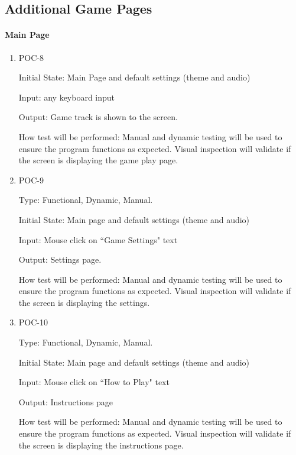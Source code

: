 \documentclass[12pt, titlepage]{article}
\begin{document}
\subsection{Additional Game Pages}

\paragraph{Main Page}

\begin{enumerate}

\item{POC-8\\}
					
Initial State: Main Page and default settings (theme and audio)
					
Input: any keyboard input 
					
Output: Game track is shown to the screen. 
					
How test will be performed: Manual and dynamic testing will be used to ensure the program functions as expected. Visual inspection will validate if the screen is displaying the game play page. 
					
\item{POC-9\\}

Type: Functional, Dynamic, Manual.
					
Initial State: Main page and default settings (theme and audio) 
					
Input: Mouse click on ``Game Settings" text
					
Output: Settings page. 
					
How test will be performed: Manual and dynamic testing will be used to ensure the program functions as expected. Visual inspection will validate if the screen is displaying the settings.  

\item{POC-10\\}

Type: Functional, Dynamic, Manual.
					
Initial State: Main page and default settings (theme and audio) 
					
Input: Mouse click on ``How to Play" text
					
Output: Instructions page
					
How test will be performed: Manual and dynamic testing will be used to ensure the program functions as expected. Visual inspection will validate if the screen is displaying the instructions page. 

\end{enumerate}
\end{document}
